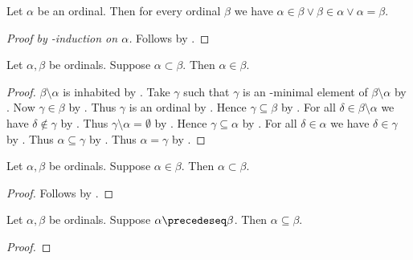\begin{proposition}\label{ordinal_elem_connex}
    Let $\alpha$ be an ordinal.
    Then for every ordinal $\beta$
    we have $\alpha\in\beta\lor \beta\in\alpha \lor \alpha = \beta$.
\end{proposition}
\begin{proof}[Proof by \in-induction on $\alpha$]
    Follows by .
\end{proof}

\begin{proposition}\label{ordinal_proper_subset_implies_elem}
    Let $\alpha,\beta$ be ordinals.
    Suppose $\alpha\subset\beta$.
    Then $\alpha\in\beta$.
\end{proposition}
\begin{proof}
    $\beta\setminus\alpha$ is inhabited
        by .
    Take $\gamma$ such that $\gamma$ is an \in-minimal element of $\beta\setminus\alpha$
        by .
    Now $\gamma\in\beta$ by .
    Thus $\gamma$ is an ordinal by .
    Hence $\gamma\subseteq\beta$ by .
    For all $\delta\in\beta\setminus\alpha$ we have $\delta\notin\gamma$
        by .
    Thus $\gamma\setminus\alpha = \emptyset$
        by .
    Hence $\gamma\subseteq\alpha$
        by .
    For all $\delta\in\alpha$ we have $\delta\in\gamma$
        by .
    Thus $\alpha\subseteq\gamma$ by .
    Thus $\alpha = \gamma$ by .
\end{proof}

\begin{proposition}\label{ordinal_elem_implies_proper_subset}
    Let $\alpha,\beta$ be ordinals.
    Suppose $\alpha\in\beta$.
    Then $\alpha\subset\beta$.
\end{proposition}
\begin{proof}
    Follows by .
\end{proof}

\begin{proposition}\label{ordinal_preceq_implies_subseteq}
Let $\alpha,\beta$ be ordinals.
Suppose $\alpha\precedeseq\beta$.
Then $\alpha\subseteq\beta$.
\end{proposition}
\begin{proof}
\end{proof}

